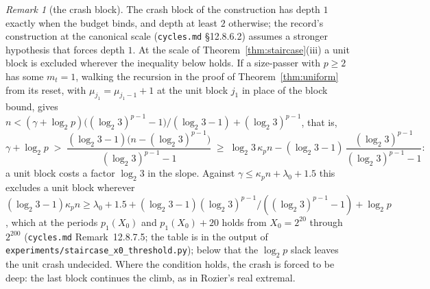 \documentclass[11pt]{article}
\theoremstyle{remark}
\newtheorem{remark}[theorem]{Remark}
\newcommand{\LL}{\log_2 3}
\newcommand{\kp}{\kappa_p}
\begin{document}
\begin{remark}[the crash block]\label{rem:crash}
The crash block of the construction has depth $1$ exactly when the budget binds, and depth at least $2$ otherwise; the record's construction at the canonical scale (\texttt{cycles.md} \S12.8.6.2) assumes a stronger hypothesis that forces depth $1$. At the scale of Theorem~\ref{thm:staircase}(iii) a unit block is excluded wherever the inequality below holds. If a size-passer with $p \ge 2$ has some $m_t = 1$, walking the recursion in the proof of Theorem~\ref{thm:uniform} from its reset, with $\mu_{j_1} = \mu_{j_1-1} + 1$ at the unit block $j_1$ in place of the block bound, gives $n < (\gamma + \log_2 p)\bigl((\LL)^{p-1} - 1\bigr)/(\LL - 1) + (\LL)^{p-1}$, that is,
\[ \gamma + \log_2 p \;>\; \frac{(\LL - 1)\bigl(n - (\LL)^{p-1}\bigr)}{(\LL)^{p-1} - 1} \;\ge\; \LL\,\kp n - (\LL - 1)\,\frac{(\LL)^{p-1}}{(\LL)^{p-1} - 1} : \]
a unit block costs a factor $\LL$ in the slope. Against $\gamma \le \kp n + \lambda_0 + 1.5$ this excludes a unit block wherever $(\LL - 1)\kp n \ge \lambda_0 + 1.5 + (\LL - 1)(\LL)^{p-1}/((\LL)^{p-1} - 1) + \log_2 p$, which at the periods $p_1(X_0)$ and $p_1(X_0) + 20$ holds from $X_0 = 2^{20}$ through $2^{200}$ (\texttt{cycles.md} Remark~12.8.7.5; the table is in the output of \texttt{experiments/staircase\_x0\_threshold.py}); below that the $\log_2 p$ slack leaves the unit crash undecided. Where the condition holds, the crash is forced to be deep: the last block continues the climb, as in Rozier's real extremal.
\end{remark}
\end{document}
